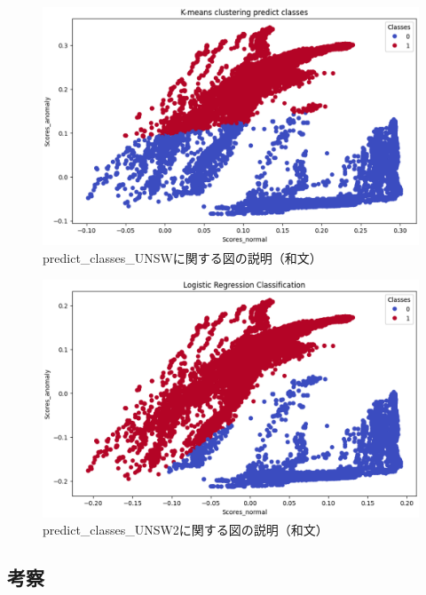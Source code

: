 \documentclass{css}
\begin{document}
\begin{figure}[tb]
    \centering
    \includegraphics[width=\linewidth]{pictures/eps/predict_classes_UNSW.eps}
    \caption{predict\_classes\_UNSWに関する図の説明（和文）}
    \label{fig:predict_classes_UNSW}
\end{figure}

\begin{figure}[tb]
    \centering
    \includegraphics[width=\linewidth]{pictures/eps/predict_classes_UNSW2.eps}
    \caption{predict\_classes\_UNSW2に関する図の説明（和文）}
    \label{fig:predict_classes_UNSW2}
\end{figure}

\subsection{考察}
\end{document}
